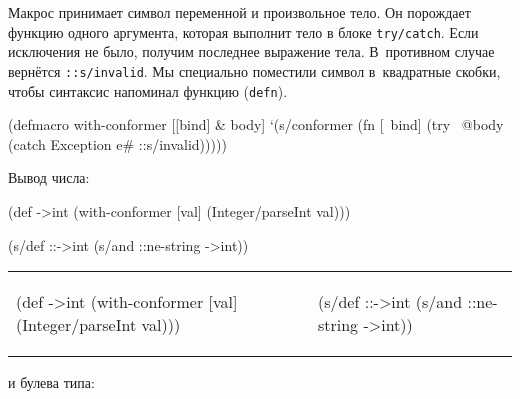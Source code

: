 Макрос принимает символ переменной и произвольное тело. Он порождает функцию
одного аргумента, которая выполнит тело в блоке \verb|try/catch|. Если
исключения не было, получим последнее выражение тела. В~противном случае
вернётся \verb|::s/invalid|. Мы специально поместили символ в~квадратные скобки,
чтобы синтаксис напоминал функцию (\verb|defn|).

\begin{english}
  \begin{clojure}
(defmacro with-conformer
  [[bind] & body]
  `(s/conformer
    (fn [~bind]
      (try
        ~@body
        (catch Exception e#
          ::s/invalid)))))
  \end{clojure}
\end{english}

\noindent

Вывод числа:

\ifx\devicetype\mobile

\begin{english}
  \begin{clojure}
(def ->int
  (with-conformer [val]
    (Integer/parseInt val)))
  \end{clojure}

\splitter

  \begin{clojure}
(s/def ::->int
  (s/and ::ne-string
         ->int))
  \end{clojure}
\end{english}

\else

\begin{english}

\noindent
\begin{tabular}{ @{}p{5cm} @{}p{5cm} }

  \begin{clojure}
(def ->int
  (with-conformer [val]
    (Integer/parseInt val)))
  \end{clojure}

&

  \begin{clojure}
(s/def ::->int
  (s/and ::ne-string
         ->int))
  \end{clojure}

\end{tabular}

\end{english}

\fi

\noindent
и булева типа:

